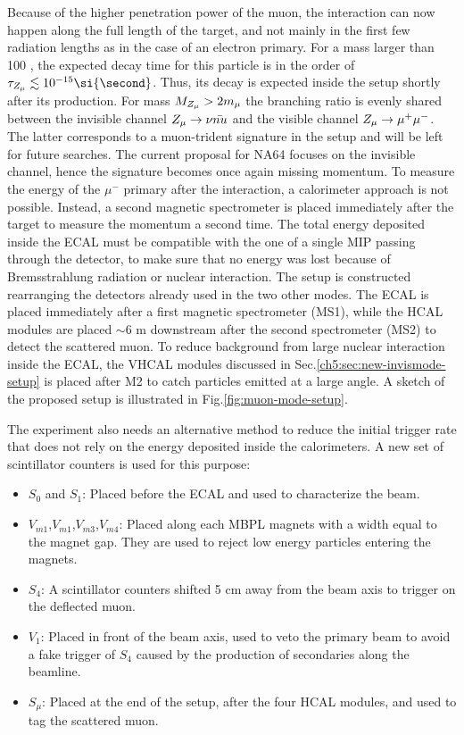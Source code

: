 Because of the higher penetration power of the muon, the interaction can now happen along the full length of the target, and not mainly in the first few radiation lengths as in the case of an electron primary.
For a mass larger than 100 \mev, the expected decay time for this particle is in the order of $\tau_{\DMU} \lesssim 10^{-15} \si{\second}$. Thus, its decay is expected inside the setup shortly after its production. For mass $M_{Z_{\mu}} > 2 m_{\mu}$ the branching ratio is evenly shared between the invisible channel $Z_{\mu} \to \nu \bar{nu}$ and the visible channel $Z_{\mu} \to \mu^+ \mu^-$. The latter corresponds to a muon-trident signature in the setup and will be left for future searches. The current proposal for NA64 focuses on the invisible channel, hence the signature becomes once again missing momentum. To measure the energy of the $\mu^-$ primary after the interaction, a calorimeter approach is not possible. Instead, a second magnetic spectrometer is placed immediately after the target to measure the momentum a second time. The total energy deposited inside the ECAL must be compatible with the one of a single MIP passing through the detector, to make sure that no energy was lost because of Bremsstrahlung radiation or nuclear interaction. The setup is constructed rearranging the detectors already used in the two other modes. The ECAL is placed immediately after a first magnetic spectrometer (MS1), while the HCAL modules are placed $\sim$6 \si{\meter} downstream after the second spectrometer (MS2) to detect the scattered muon. To reduce background from large nuclear interaction inside the ECAL, the VHCAL modules discussed in Sec.\ref{ch5:sec:new-invismode-setup} is placed after M2 to catch particles emitted at a large angle. A sketch of the proposed setup is illustrated in Fig.\ref{fig:muon-mode-setup}.

The experiment also needs an alternative method to reduce the initial trigger rate that does not rely on the energy deposited inside the calorimeters. A new set of scintillator counters is used for this purpose:
\begin{itemize}
\item $S_0$ and $S_1$: Placed before the ECAL and used to characterize the beam.
\item $V_{m1}$,$V_{m1}$,$V_{m3}$,$V_{m4}$: Placed along each MBPL magnets with a width equal to the magnet gap. They are used to reject low energy particles entering the magnets.
\item $S_4$: A scintillator counters shifted 5 \si{\centi\meter} away from the beam axis to trigger on the deflected muon.
\item $V_1$: Placed in front of the beam axis, used to veto the primary beam to avoid a fake trigger of $S_4$ caused by the production of secondaries along the beamline.
\item $S_{\mu}$: Placed at the end of the setup, after the four HCAL modules, and used to tag the scattered muon.
\end{itemize}

